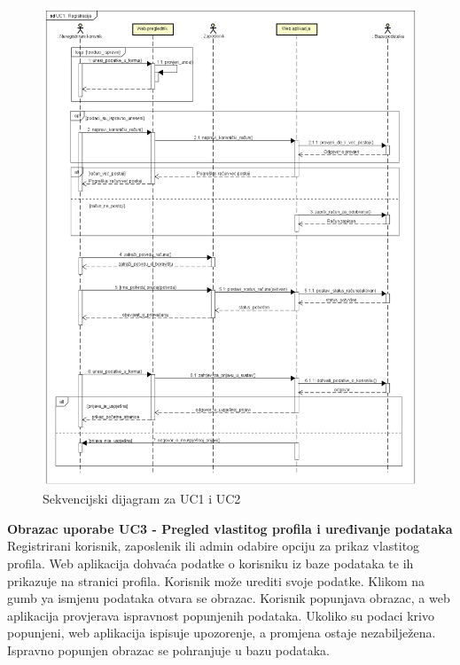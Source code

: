 \begin{figure}[H]
	\includegraphics[width=.9\linewidth]{slike/UC1_Registracija.png}
	\caption{Sekvencijski dijagram za UC1 i UC2}
	\label{fig:skvDReg}
\end{figure}
\eject

\textbf{Obrazac uporabe UC3 - Pregled vlastitog profila i uređivanje podataka}\\

{Registrirani korisnik, zaposlenik ili admin odabire opciju za prikaz vlastitog profila. Web aplikacija dohvaća podatke o korisniku iz baze podataka te ih prikazuje na stranici profila. Korisnik može urediti svoje podatke. Klikom na gumb ya ismjenu podataka otvara se obrazac. Korisnik popunjava obrazac, a web aplikacija provjerava ispravnost popunjenih podataka. Ukoliko su podaci krivo popunjeni, web aplikacija ispisuje upozorenje, a promjena ostaje nezabilježena. Ispravno popunjen obrazac se pohranjuje u bazu podataka. }


